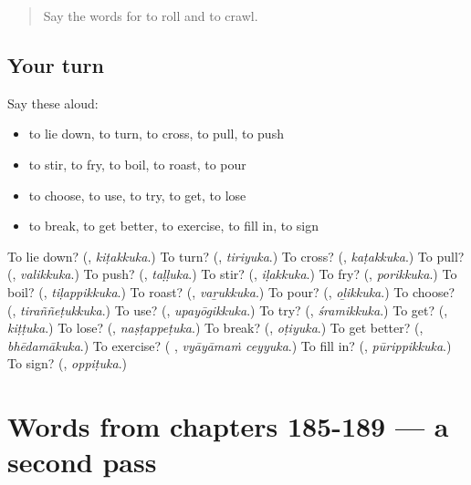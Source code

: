 \label{lesson:ML-R189-first-pass-words-from-chapters-181-184}



\begin{quote}
Say the words for to roll and to crawl.
\end{quote}

\subsection*{Your turn}
Say these aloud:

\begin{itemize}
\raggedright
  \item to lie down, to turn, to cross, to pull, to push
  \item to stir, to fry, to boil, to roast, to pour
  \item to choose, to use, to try, to get, to lose
  \item to break, to get better, to exercise, to fill in, to sign
\end{itemize}

\begin{tcolorbox}[breakable,colback=teal!4,colframe=teal!35!black,title={Before you move on}]
To lie down? (\textbf{}, \emph{kiṭakkuka}.) To turn? (\textbf{}, \emph{tiriyuka}.) To cross? (\textbf{}, \emph{kaṭakkuka}.) To pull? (\textbf{}, \emph{valikkuka}.) To push? (\textbf{}, \emph{taḷḷuka}.) To stir? (\textbf{}, \emph{iḷakkuka}.) To fry? (\textbf{}, \emph{porikkuka}.) To boil? (\textbf{}, \emph{tiḷappikkuka}.) To roast? (\textbf{}, \emph{vaṟukkuka}.) To pour? (\textbf{}, \emph{oḻikkuka}.) To choose? (\textbf{}, \emph{tiraññeṭukkuka}.) To use? (\textbf{}, \emph{upayōgikkuka}.) To try? (\textbf{}, \emph{śramikkuka}.) To get? (\textbf{}, \emph{kiṭṭuka}.) To lose? (\textbf{}, \emph{naṣṭappeṭuka}.) To break? (\textbf{}, \emph{oṭiyuka}.) To get better? (\textbf{}, \emph{bhēdamākuka}.) To exercise? (\textbf{ }, \emph{vyāyāmaṁ ceyyuka}.) To fill in? (\textbf{}, \emph{pūrippikkuka}.) To sign? (\textbf{}, \emph{oppiṭuka}.)
\end{tcolorbox}
\section[(dialogue)]{Words from chapters 185-189 — a second pass}

